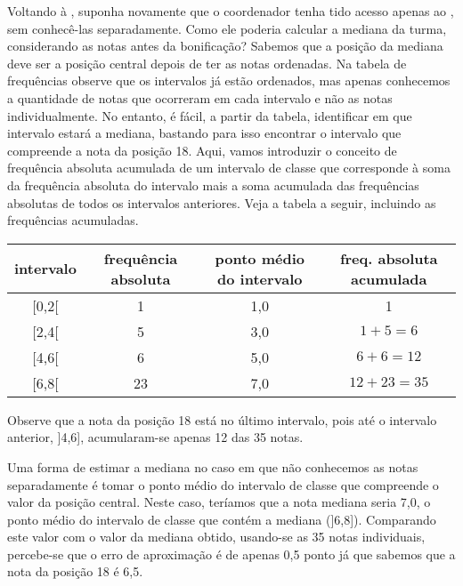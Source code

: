 
Voltando à , suponha novamente que o coordenador tenha tido acesso apenas ao
{\hyperref[\detokenize{PE104-0:fig-histograma-notas-sem-bonificacao}]{}}, sem conhecê-las separadamente.  Como ele poderia calcular a mediana da turma, considerando as notas antes da bonificação? Sabemos que a posição da mediana deve ser a posição central depois de ter as notas ordenadas. Na tabela de frequências observe que os intervalos já estão ordenados, mas apenas conhecemos a quantidade de notas que ocorreram em cada intervalo e não as notas individualmente. No entanto, é fácil, a partir da tabela, identificar em que intervalo estará a mediana, bastando para isso encontrar o intervalo que compreende a nota da posição 18. Aqui, vamos introduzir o conceito de frequência absoluta acumulada de um intervalo de classe que corresponde à soma da frequência absoluta do intervalo mais a soma acumulada das frequências absolutas  de todos os intervalos anteriores. Veja a tabela a seguir, incluindo as frequências acumuladas.


\begin{savenotes}\sphinxattablestart
\centering
{}
\label{\detokenize{PE104-1:id16}}
\sphinxaftercaption
\begin{tabulary}{\linewidth}[t]{|c|c|c|c|}
\hline

intervalo
&
frequência absoluta
&
ponto médio do intervalo
&
freq. absoluta acumulada
\\
\hline
{[}0,2{[}
&
1
&
1,0
&
1
\\
\hline
{[}2,4{[}
&
5
&
3,0
&
$1+5=6$
\\
\hline
{[}4,6{[}
&
6
&
5,0
&
$6+6=12$
\\
\hline
{[}6,8{[}
&
23
&
7,0
&
$12+23=35$
\\
\hline
\end{tabulary}
\par
\sphinxattableend\end{savenotes}

Observe que a nota da posição 18 está no último intervalo, pois até o intervalo anterior, {]}4,6{]}, acumularam-se apenas 12 das 35 notas.

Uma forma de estimar a mediana no caso em que não conhecemos as notas separadamente é tomar o ponto médio do intervalo de classe que compreende o valor da posição central. Neste caso, teríamos que a nota mediana seria 7,0, o ponto médio do intervalo de classe que contém a mediana ({]}6,8{]}). Comparando este valor com o valor da mediana obtido, usando-se as 35 notas individuais, percebe-se que o erro de aproximação é de apenas 0,5 ponto já que sabemos que a nota da posição 18 é 6,5.

